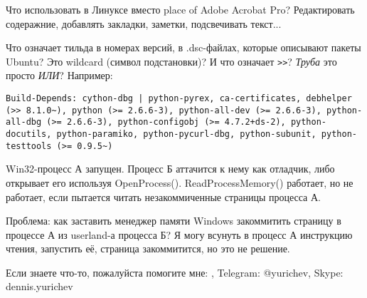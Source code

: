 Что использовать в Линуксе вместо place of Adobe Acrobat Pro?
Редактировать содеражние, добавлять закладки, заметки, подсвечивать текст...

\myhrule{}

Что означает тильда в номерах версий, в .dsc-файлах, которые описывают пакеты Ubuntu?
Это wildcard (символ подстановки)?
И что означает \verb|>>|?
\emph{Труба} это просто \emph{ИЛИ}?
Например:

\begin{lstlisting}
Build-Depends: cython-dbg | python-pyrex, ca-certificates, debhelper (>> 8.1.0~), python (>= 2.6.6-3), python-all-dev (>= 2.6.6-3), python-all-dbg (>= 2.6.6-3), python-configobj (>= 4.7.2+ds-2), python-docutils, python-paramiko, python-pycurl-dbg, python-subunit, python-testtools (>= 0.9.5~)
\end{lstlisting}

\myhrule{}

Win32-процесс А запущен.
Процесс Б аттачится к нему как отладчик, либо открывает его используя OpenProcess().
ReadProcessMemory() работает, но не работает, если пытается читать незакоммиченные страницы процесса А.

Проблема: как заставить менеджер памяти Windows закоммитить страницу в процессе А из userland-а процесса Б?
Я могу всунуть в процесс А инструкцию чтения, запустить её, страница закоммитится, но это не решение.

\myhrule{}

Если знаете что-то, пожалуйста помогите мне: \EMAIL{}, Telegram: @yurichev, Skype: dennis.yurichev
